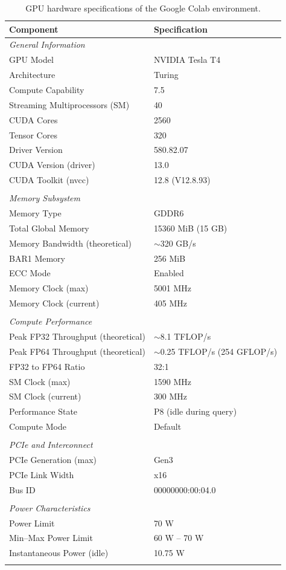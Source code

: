 \begin{table}[H]
\centering
\caption{GPU hardware specifications of the Google Colab environment.}
\label{tab:gpu_specs_colab}
\begin{tabular}{ll}
\toprule
\textbf{Component} & \textbf{Specification} \\
\midrule
\multicolumn{2}{l}{\textit{General Information}} \\
GPU Model & NVIDIA Tesla T4 \\
Architecture & Turing \\
Compute Capability & 7.5 \\
Streaming Multiprocessors (SM) & 40 \\
CUDA Cores & 2560 \\
Tensor Cores & 320 \\
Driver Version & 580.82.07 \\
CUDA Version (driver) & 13.0 \\
CUDA Toolkit (nvcc) & 12.8 (V12.8.93) \\
\\
\multicolumn{2}{l}{\textit{Memory Subsystem}} \\
Memory Type & GDDR6 \\
Total Global Memory & 15360 MiB (15 GB) \\
Memory Bandwidth (theoretical) & $\sim$320 GB/s \\
BAR1 Memory & 256 MiB \\
ECC Mode & Enabled \\
Memory Clock (max) & 5001 MHz \\
Memory Clock (current) & 405 MHz \\
\\
\multicolumn{2}{l}{\textit{Compute Performance}} \\
Peak FP32 Throughput (theoretical) & $\sim$8.1 TFLOP/s \\
Peak FP64 Throughput (theoretical) & $\sim$0.25 TFLOP/s (254 GFLOP/s) \\
FP32 to FP64 Ratio & 32:1 \\
SM Clock (max) & 1590 MHz \\
SM Clock (current) & 300 MHz \\
Performance State & P8 (idle during query) \\
Compute Mode & Default \\
\\
\multicolumn{2}{l}{\textit{PCIe and Interconnect}} \\
PCIe Generation (max) & Gen3 \\
PCIe Link Width & x16 \\
Bus ID & 00000000:00:04.0 \\
\\
\multicolumn{2}{l}{\textit{Power Characteristics}} \\
Power Limit & 70 W \\
Min--Max Power Limit & 60 W -- 70 W \\
Instantaneous Power (idle) & 10.75 W \\
\\
\bottomrule
\end{tabular}
\end{table}